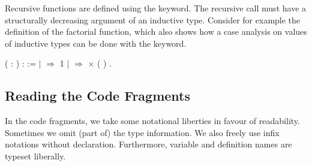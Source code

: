 Recursive functions are defined using the 
keyword. The recursive call must have a structurally decreasing
argument of an inductive type. Consider for example the definition of
the factorial function, which also shows how a case analysis on values
of inductive types can be done with the  keyword.
\begin{singlespace}
\begin{coqdoccode}
\coqdocnoindent
{}
( :
)
:
:=\coqdoceol
\coqdocindent{1.00em}
  \coqdoceol
\coqdocindent{1.00em}
\ensuremath{|}
\ensuremath{\Rightarrow} 1\coqdoceol
\coqdocindent{1.00em}
\ensuremath{|}
 \ensuremath{\Rightarrow}
 \ensuremath{\times}
(
)\coqdoceol
\coqdocindent{1.00em}
.\coqdoceol
\end{coqdoccode}
\end{singlespace}


\subsection{Reading the Code Fragments}

In the \Coq code fragments, we take some notational liberties in favour
of readability. Sometimes we omit (part of) the type information. We
also freely use infix notations without declaration. Furthermore,
variable and definition names are typeset liberally.

